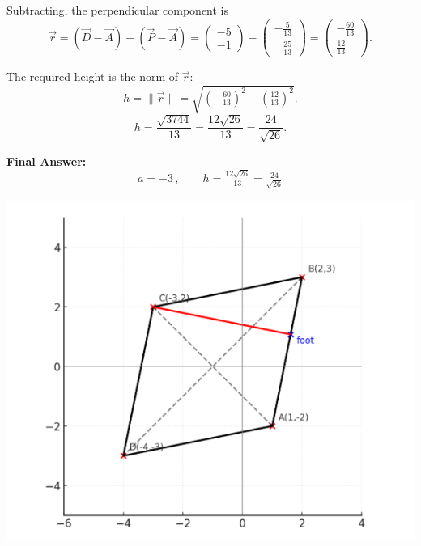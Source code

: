 \documentclass[journal]{IEEEtran}
\begin{document}
Subtracting, the perpendicular component is
\begin{equation}
\vec r=(\vec D-\vec A)-(\vec P-\vec A)
=\begin{pmatrix}-5\\-1\end{pmatrix}
-\begin{pmatrix}-\tfrac{5}{13}\\[4pt]-\tfrac{25}{13}\end{pmatrix}
=\begin{pmatrix}-\tfrac{60}{13}\\[4pt]\tfrac{12}{13}\end{pmatrix}.
\end{equation}

The required height is the norm of $\vec r$:
\begin{equation}
h=\|\vec r\|
=\sqrt{\left(-\tfrac{60}{13}\right)^2+\left(\tfrac{12}{13}\right)^2}.
\end{equation}
\begin{equation}
h=\frac{\sqrt{3744}}{13}
=\frac{12\sqrt{26}}{13}
=\frac{24}{\sqrt{26}}.
\end{equation}

\bigskip

\noindent
\textbf{Final Answer:}
\begin{equation}
\boxed{\,a=-3\,,\qquad h=\tfrac{12\sqrt{26}}{13}=\tfrac{24}{\sqrt{26}}\,}
\end{equation}
\bigskip

\begin{center}
    \includegraphics[width=0.8\columnwidth]{figs/fig4.png}
\end{center}
\end{document}
